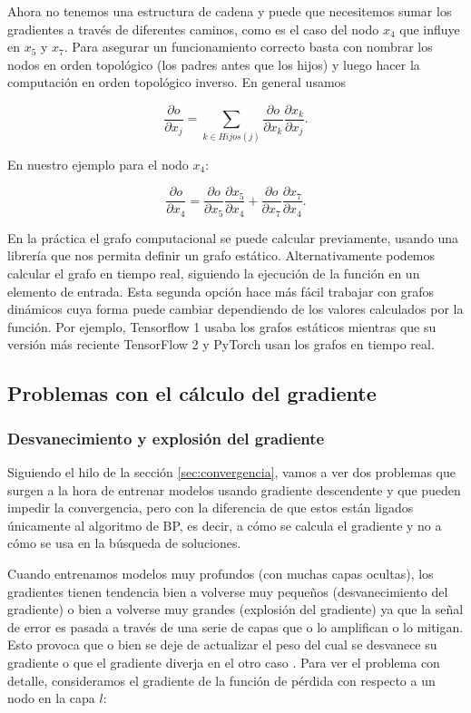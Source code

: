 Ahora no tenemos una estructura de cadena y puede que necesitemos sumar los gradientes a través de diferentes caminos, como es el caso del nodo $x_4$ que influye en $x_5$ y $x_7$. Para asegurar un funcionamiento correcto basta con nombrar los nodos en orden topológico (los padres antes que los hijos) y luego hacer la computación en orden topológico inverso. En general usamos

$$ \frac{\partial o }{ \partial x_j } = \sum_{k \in Hijos(j)} \frac{\partial o}{ \partial x_k} \frac{\partial x_k}{\partial x_j}.$$

En nuestro ejemplo para el nodo $x_4$:

$$   \frac{\partial o }{ \partial x_4 }  =  \frac{\partial o}{ \partial x_5} \frac{\partial x_5}{\partial x_4} +\frac{\partial o}{ \partial x_7} \frac{\partial x_7}{\partial x_4} .$$


En la práctica el grafo computacional se puede calcular previamente, usando una librería que nos permita definir un grafo estático. Alternativamente podemos calcular el grafo en tiempo real, siguiendo la ejecución de la función en un elemento de entrada. Esta segunda opción hace más fácil trabajar con grafos dinámicos cuya forma puede cambiar dependiendo de los valores calculados por la función. Por ejemplo, Tensorflow 1 usaba los grafos estáticos mientras que su versión más reciente TensorFlow 2 y PyTorch usan los grafos en tiempo real. 




\subsection{Problemas con el cálculo del gradiente}

\subsubsection{Desvanecimiento y explosión del gradiente}\label{sec:desvyexpl}


Siguiendo el hilo de la sección \ref{sec:convergencia}, vamos a ver dos problemas que surgen a la hora de entrenar modelos usando gradiente descendente y que pueden impedir la convergencia, pero con la diferencia de que estos están ligados únicamente al algoritmo de BP, es decir, a cómo se calcula el gradiente y no a cómo se usa en la búsqueda de soluciones.

Cuando entrenamos modelos muy profundos (con muchas capas ocultas), los gradientes tienen tendencia bien a volverse muy pequeños (desvanecimiento del gradiente) o bien a volverse muy grandes (explosión del gradiente) ya que la señal de error es pasada a través de una serie de capas que o lo amplifican o lo mitigan. Esto provoca que o bien se deje de actualizar el peso del cual se desvanece su gradiente o que el gradiente diverja en el otro caso \cite{VanishExplode}. Para ver el problema con detalle, consideramos el gradiente de la función de pérdida con respecto a un nodo en la capa $l$:

